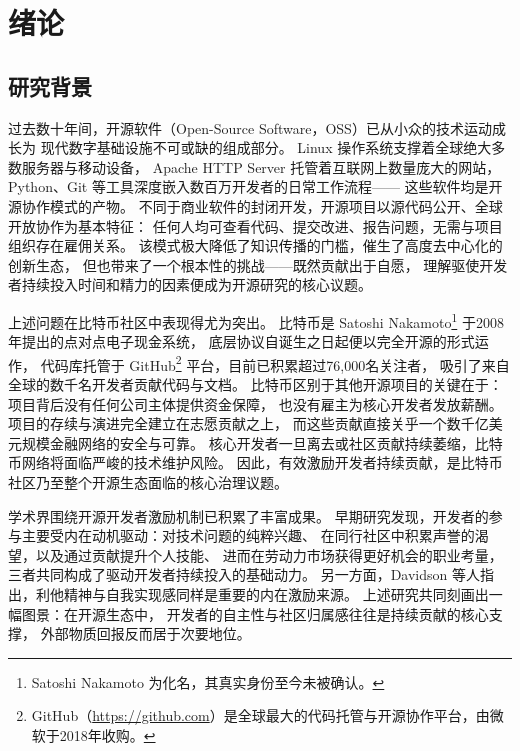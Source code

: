 \chapter{绪论}

\section{研究背景}

过去数十年间，开源软件（Open-Source Software，OSS）已从小众的技术运动成长为
现代数字基础设施不可或缺的组成部分\cite{lerner2002simple,chen2021opensource}。
Linux 操作系统支撑着全球绝大多数服务器与移动设备，
Apache HTTP Server 托管着互联网上数量庞大的网站，
Python、Git 等工具深度嵌入数百万开发者的日常工作流程——
这些软件均是开源协作模式的产物\cite{lakhani2003open}。
不同于商业软件的封闭开发，开源项目以源代码公开、全球开放协作为基本特征：
任何人均可查看代码、提交改进、报告问题，无需与项目组织存在雇佣关系。
该模式极大降低了知识传播的门槛，催生了高度去中心化的创新生态，
但也带来了一个根本性的挑战——既然贡献出于自愿，
理解驱使开发者持续投入时间和精力的因素便成为开源研究的核心议题。

上述问题在比特币社区中表现得尤为突出。
比特币是 Satoshi Nakamoto\footnote{Satoshi Nakamoto 为化名，其真实身份至今未被确认。} 于2008年提出的点对点电子现金系统\cite{nakamoto2008bitcoin,cheng2024bitcoin}，
底层协议自诞生之日起便以完全开源的形式运作，
代码库托管于 GitHub\footnote{GitHub（\url{https://github.com}）是全球最大的代码托管与开源协作平台，由微软于2018年收购。} 平台，目前已积累超过76,000名关注者，
吸引了来自全球的数千名开发者贡献代码与文档。
比特币区别于其他开源项目的关键在于：项目背后没有任何公司主体提供资金保障，
也没有雇主为核心开发者发放薪酬。项目的存续与演进完全建立在志愿贡献之上，
而这些贡献直接关乎一个数千亿美元规模金融网络的安全与可靠。
核心开发者一旦离去或社区贡献持续萎缩，比特币网络将面临严峻的技术维护风险。
因此，有效激励开发者持续贡献，是比特币社区乃至整个开源生态面临的核心治理议题。

学术界围绕开源开发者激励机制已积累了丰富成果。
早期研究发现，开发者的参与主要受内在动机驱动：对技术问题的纯粹兴趣\cite{shah2006motivation}、
在同行社区中积累声誉的渴望\cite{lerner2002simple}，以及通过贡献提升个人技能、
进而在劳动力市场获得更好机会的职业考量\cite{fang2009understanding}，
三者共同构成了驱动开发者持续投入的基础动力。
另一方面，Davidson 等人\cite{davidson2014older}指出，利他精神与自我实现感同样是重要的内在激励来源。
上述研究共同刻画出一幅图景：在开源生态中，
开发者的自主性与社区归属感往往是持续贡献的核心支撑，
外部物质回报反而居于次要地位。

